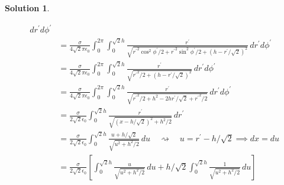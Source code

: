\documentclass[10pt]{article}
\theoremstyle{definition}
\newtheorem{soln}{Solution}
\newcommand{\primed}[1]{{#1^\prime}}
\begin{document}
\begin{soln}
\begin{enumerate}[label=(\alph*)]
\begin{enumerate}[label=(\roman*)]
\begin{align*}
{{                      }}
                    \,d\primed{r}d\primed{\phi}                                          \\
                             & =\frac{\sigma}{4\sqrt{2}\pi\epsilon_0}
                    \int_{0}^{2\pi}\int_{0}^{\sqrt{2}h}
                    \frac{\primed{r}}{\sqrt{{\primed{r}}^2\cos^2\primed{\phi}/2
                    +{\primed{r}}^2\sin^2\primed{\phi}/2
                    +\left(h-\primed{r}/\sqrt{2}\right)^2
                    }}
                    \,d\primed{r}d\primed{\phi}                                          \\
                             & =\frac{\sigma}{4\sqrt{2}\pi\epsilon_0}
                    \int_{0}^{2\pi}\int_{0}^{\sqrt{2}h}
                    \frac{\primed{r}}{\sqrt{
                        {\primed{r}}^2/2
                        +\left(h-\primed{r}/\sqrt{2}\right)^2
                      }}
                    \,d\primed{r}d\primed{\phi}                                          \\
                             & =\frac{\sigma}{4\sqrt{2}\pi\epsilon_0}
                    \int_{0}^{2\pi}\int_{0}^{\sqrt{2}h}
                    \frac{\primed{r}}{\sqrt{
                        {\primed{r}}^2/2
                        +h^2-2h\primed{r}/\sqrt{2}+\primed{r}^2/2
                      }}
                    \,d\primed{r}d\primed{\phi}                                          \\
                             & =\frac{\sigma}{2\sqrt{2}\epsilon_0}
                    \int_{0}^{\sqrt{2}h}
                    \frac{\primed{r}}{\sqrt{
                        (x-h/\sqrt{2})^2+h^2/2
                      }}
                    \,d\primed{r}                                                        \\
                             & =\frac{\sigma}{2\sqrt{2}\epsilon_0}
                    \int_{0}^{\sqrt{2}h}
                    \frac{u+h/\sqrt{2}}{\sqrt{
                        u^2+h^2/2
                      }}
                    \,du\quad\rightsquigarrow\quad u=\primed{r}-h/\sqrt{2}\implies dx=du \\
                             & =\frac{\sigma}{2\sqrt{2}\epsilon_0}
                    \left[\int_{0}^{\sqrt{2}h}
                    \frac{u}{\sqrt{
                        u^2+h^2/2
                      }}
                    \,du+h/\sqrt{2}\int_{0}^{\sqrt{2}h}
                    \frac{1}{\sqrt{
                        u^2+h^2/2
                      }}
                    \,du\right]                                                          \\

\end{align*}
\end{enumerate}
\end{enumerate}
\end{soln}
\end{document}
